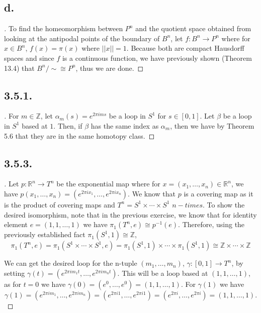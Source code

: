 \documentclass{article}
\begin{document}
\subsection*{d.}
\begin{proof}[\unskip\nopunct]
   To find the homeomorphism between $P^n$ and the quotient space obtained from looking at the antipodal points of the boundary of $B^n$, let $f: B^n \to P^n$ where for $x \in B^n$, $f(x) = \pi(x)$ where $||x|| = 1$. Because both are compact Hausdorff spaces and since $f$ is a continuous function,
   we have previously shown (Theorem 13.4) that $B^n/\sim \cong P^n$, thus we are done. 
\end{proof}

\subsection*{3.5.1.}
\begin{proof}[\unskip\nopunct]
   For $m \in \mathbb{Z}$, let $\alpha_m(s) = e^{2 \pi i ms}$ be a loop in $S^1$ for $s \in [0, 1]$. Let $\beta$ be a loop in $S^1$ based at $1$. Then, if $\beta$ has the same index as $\alpha_m$, then we have by Theorem 5.6 that they are in the same homotopy class. 
\end{proof}

\subsection*{3.5.3.}
\begin{proof}[\unskip\nopunct]
  Let $p: \mathbb{R}^n \to T^n$ be the exponential map where for $ x = (x_1, \ldots , x_n) \in \mathbb{R}^n$, we have $p(x_1, \ldots, x_n) = (e^{2\pi i x_1}, \ldots , e^{2 \pi i x_n})$. 
  We know that $p$ is a covering map as it is the product of covering maps and $T^n = S^1 \times \cdots \times S^1$ $n-times$. 
  To show the desired isomorphism, note that in the previous exercise, we know that for identity element $e = (1, 1, \ldots, 1)$ we have $\pi_1(T^n, e) \cong p^{-1}(e)$. Therefore, using the previously established fact $\pi_1(S^1, 1) \cong \mathbb{Z}$, \[\pi_1(T^n, e) = \pi_1(S^1 \times \cdots \times S^1, e) = \pi_1(S^1, 1) \times \cdots \times \pi_1(S^1, 1) \cong \mathbb{Z} \times \cdots \times \mathbb{Z} \]


  We can get the desired loop for the n-tuple $(m_1, \ldots , m_n)$, $\gamma: [0, 1] \to T^n$, by setting $\gamma(t) = (e^{2 \pi i m_1 t}, \ldots , e^{2 \pi i m_n t})$. 
  This will be a loop based at $(1, 1, \ldots , 1)$, as for $t = 0$ we have $\gamma(0) = (e^0, \ldots, e^0) = (1, 1, \ldots, 1)$. For $\gamma(1)$ we have 
  \[
   \gamma(1) = (e^{2\pi i m_1}, \ldots , e^{2 \pi i m_n}) = (e^{2 \pi i 1}, \ldots , e^{2 \pi i 1}) = (e^{2 \pi i}, \ldots , e^{2 \pi i}) = (1, 1 , \ldots , 1).
   \]
\end{proof}
\end{document}
